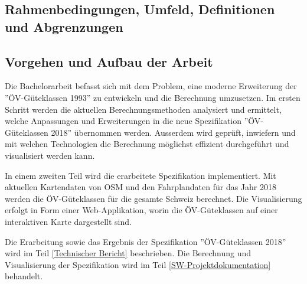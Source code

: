 \subsection{Rahmenbedingungen, Umfeld, Definitionen und Abgrenzungen}
\label{Einführung:Rahmenbedingungen, Umfeld, Definitionen, Abgrenzungen}


\subsection{Vorgehen und Aufbau der Arbeit}
\label{Einführung:Vorgehen und Aufbau der Arbeit}

Die Bachelorarbeit befasst sich mit dem Problem, eine moderne Erweiterung der ''\acs{ÖV}-Güteklassen 1993'' zu entwickeln und die Berechnung umzusetzen.
Im ersten Schritt werden die aktuellen Berechnungsmethoden analysiert und ermittelt, welche Anpassungen und Erweiterungen in die neue Spezifikation ''\acs{ÖV}-Güteklassen 2018'' übernommen werden.
Ausserdem wird geprüft, inwiefern und mit welchen Technologien die Berechnung möglichst effizient durchgeführt und visualisiert werden kann.

In einem zweiten Teil wird die erarbeitete Spezifikation implementiert.
Mit aktuellen Kartendaten von \ac{OSM} und den Fahrplandaten für das Jahr 2018 werden die \acs{ÖV}-Güteklassen für die gesamte Schweiz berechnet.
Die Visualisierung erfolgt in Form einer Web-Applikation, worin die \acs{ÖV}-Güteklassen auf einer interaktiven Karte dargestellt sind.

Die Erarbeitung sowie das Ergebnis der Spezifikation ''\acs{ÖV}-Güteklassen 2018'' wird im Teil \ref{Technischer Bericht} beschrieben.
Die Berechnung und Visualisierung der Spezifikation wird im Teil \ref{SW-Projektdokumentation} behandelt.
